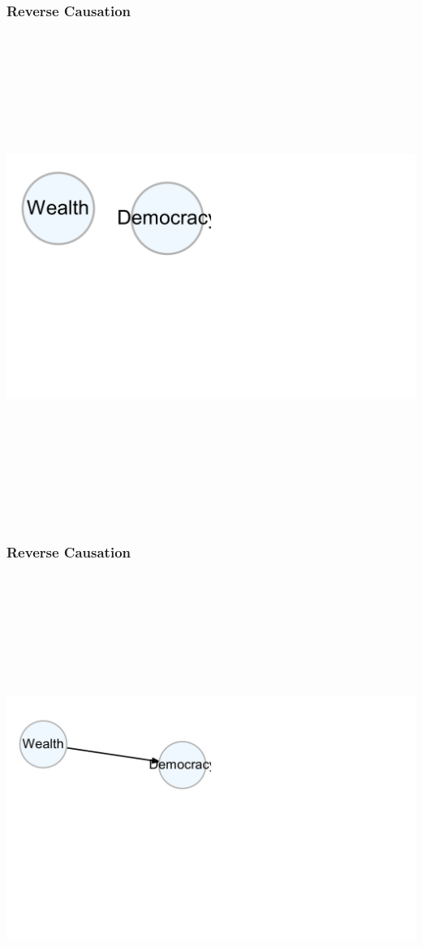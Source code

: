 \documentclass[xcolor=x11names,compress]{beamer}\usepackage[]{graphicx}\usepackage[]{color}
\newenvironment{knitrout}{}{} %
\renewcommand{\(}{\begin{columns}}
\renewcommand{\)}{\end{columns}}
\newcommand{\<}[1]{\begin{column}{#1}}
\renewcommand{\>}{\end{column}}
\begin{document}
\begin{frame}
\frametitle{Reverse Causation}
\begin{knitrout}
\color{fgcolor}

{\centering \includegraphics[width=600,height=600]{figure/unnamed-chunk-5-1} 

}



\end{knitrout}
\end{frame}

\begin{frame}
\frametitle{Reverse Causation}
\begin{knitrout}
\color{fgcolor}

{\centering \includegraphics[width=600,height=600]{figure/unnamed-chunk-6-1} 

}



\end{knitrout}
\end{frame}
\end{document}

